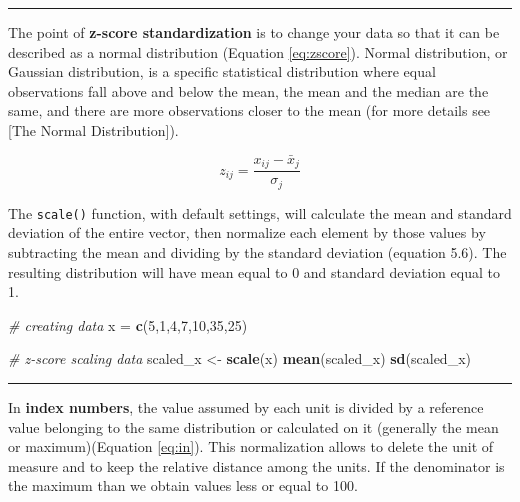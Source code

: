 \documentclass[
]{article}
\newenvironment{Shaded}{\begin{snugshade}}{\end{snugshade}}
\newcommand{\CommentTok}[1]{\textcolor[rgb]{0.56,0.35,0.01}{\textit{#1}}}
\newcommand{\DecValTok}[1]{\textcolor[rgb]{0.00,0.00,0.81}{#1}}
\newcommand{\FunctionTok}[1]{\textcolor[rgb]{0.13,0.29,0.53}{\textbf{#1}}}
\newcommand{\NormalTok}[1]{#1}
\newcommand{\OtherTok}[1]{\textcolor[rgb]{0.56,0.35,0.01}{#1}}
\begin{document}
\begin{center}\rule{0.5\linewidth}{0.5pt}\end{center}

The point of \textbf{z-score standardization} is to change your data so that
it can be described as a normal distribution (Equation \eqref{eq:zscore}). Normal distribution, or
Gaussian distribution, is a specific statistical distribution where
equal observations fall above and below the mean, the mean and the
median are the same, and there are more observations closer to the mean
(for more details see {[}The Normal Distribution{]}).

\begin{equation}
z_{ij}=\frac{x_{ij}-\bar x_j}{\sigma_j}
\label{eq:zscore}
\end{equation}

The \texttt{scale()} function, with default settings, will calculate the mean
and standard deviation of the entire vector, then normalize each element
by those values by subtracting the mean and dividing by the standard
deviation (equation 5.6). The resulting distribution will have mean
equal to 0 and standard deviation equal to 1.

\begin{Shaded}
\begin{Highlighting}[]
\CommentTok{\# creating data}
\NormalTok{x }\OtherTok{=} \FunctionTok{c}\NormalTok{(}\DecValTok{5}\NormalTok{,}\DecValTok{1}\NormalTok{,}\DecValTok{4}\NormalTok{,}\DecValTok{7}\NormalTok{,}\DecValTok{10}\NormalTok{,}\DecValTok{35}\NormalTok{,}\DecValTok{25}\NormalTok{)}

\CommentTok{\# z{-}score scaling data}
\NormalTok{scaled\_x }\OtherTok{\textless{}{-}} \FunctionTok{scale}\NormalTok{(x)}
\FunctionTok{mean}\NormalTok{(scaled\_x)}
\FunctionTok{sd}\NormalTok{(scaled\_x)}
\end{Highlighting}
\end{Shaded}

\begin{center}\rule{0.5\linewidth}{0.5pt}\end{center}

In \textbf{index numbers}, the value assumed by each unit is divided by a
reference value belonging to the same distribution or calculated on it
(generally the mean or maximum)(Equation \eqref{eq:in}). This normalization allows
to delete the unit of measure and to keep the relative distance among
the units. If the denominator is the maximum than we obtain values less
or equal to 100.
\end{document}
